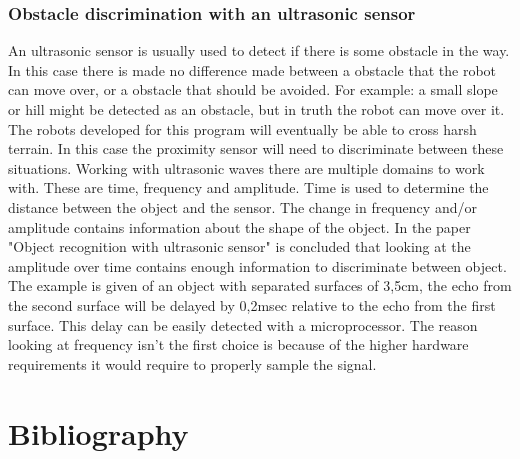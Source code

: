 \documentclass[10pt,a4paper]{article}
\begin{document}
\subsubsection{Obstacle discrimination with an ultrasonic sensor}
An ultrasonic sensor is usually used to detect if there is some obstacle in the way. In this case there is made no difference made between a obstacle that the robot can move over, or a obstacle that should be avoided. For example: a small slope or hill might be detected as an obstacle, but in truth the robot can move over it. The robots developed for this program will eventually be able to cross harsh terrain. In this case the proximity sensor will need to discriminate between these situations. Working with ultrasonic waves there are multiple domains to work with. These are time, frequency and amplitude. Time is used to determine the distance between the object and the sensor. The change in frequency and/or amplitude contains information about the shape of the object\cite{ultraobject}. 
In the paper "Object recognition with ultrasonic sensor" is concluded 
that looking at the amplitude over time contains enough information to discriminate between object\cite{ultraobject}. The example is given of an object with separated surfaces of 3,5cm, the echo from the second surface will be delayed by 0,2msec relative to the echo from the first surface. This delay can be easily detected with a microprocessor. The reason looking at frequency isn't the first choice is because of the higher hardware requirements it would require to properly sample the signal. 
\\

\newpage

\section{Bibliography}


\end{document}
